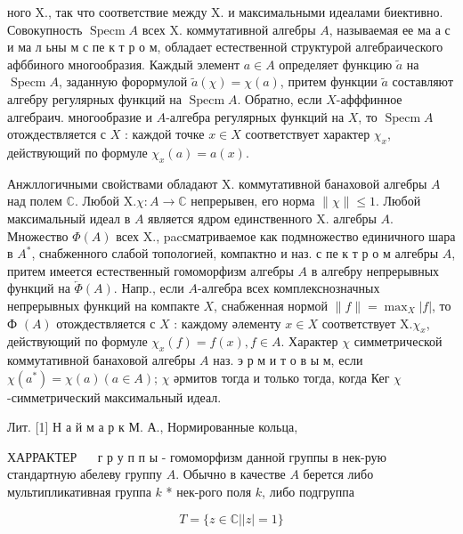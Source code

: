 \documentclass[10pt]{article}
\begin{document}
ного X., так что соответствие между X. и максимальными идеалами биективно. Совокупность $\operatorname{Specm} A$ всех $\mathrm{X}$. коммутативной алгебры $A$, называемая ее ма а с и ма л ьны м с пе к т р о м, обладает естественной структурой алгебраического афббиного многообразия. Каждый элемент $a \in A$ определяет функцию $\tilde{a}$ на $\operatorname{Specm} A$, заданную форормулой $\tilde{a}(\chi)=\chi(a)$, притем функции $\tilde{a}$ составляют алгебру регулярных функций на $\operatorname{Specm} A$. Обратно, если $X$-афффинное алгебраич. многообразие и $A$-алгебра регулярных функций на $X$, то $\operatorname{Specm} A$ отождествляется с $X$ : каждой точке $x \in X$ соответствует характер $\chi_{x}$, действующий по формуле $\chi_{x}(a)=a(x)$.



Анжллогичными свойствами обладают X. коммутативной банаховой алгебры $A$ над полем $\mathbb{C}$. Любой $\mathrm{X} . \chi: A \longrightarrow \mathbb{C}$ непрерывен, его норма $\|\chi\| \leqslant 1$. Любой максимальный идеал в $A$ является ядром единственного $\mathrm{X}$. алгебры $A$. Множество $\Phi(A)$ всех X., pacсматриваемое как подмножество единичного шара в $A^{*}$, снабженного слабой топологией, компактно и наз. с пе к т р о м алгебры $A$, притем имеется естественный гомоморфизм алгебры $A$ в алгебру непрерывных функций на $\overleftarrow{\Phi}(A)$. Напр., если $A$-алгебра всех комплекснозначных непрерывных функций на компакте $X$, снабженная нормой $\|f\|=\max _{X}|f|$, то Ф $(A)$ отождествляется с $X$ : каждому әлементу $x \in X$ соответствует $\mathrm{X} . \chi_{x}$, действующий по формуле $\chi_{x}(f)=f(x), f \in A$. Характер $\chi$ симметрической коммутативной банаховой алгебры $A$ наз. э р м и т о в ы м, если $\chi\left(a^{*}\right)=\chi(a)(a \in A)$; $\chi$ әрмитов тогда и только тогда, когда Кег $\chi$-симметрический максимальный идеал.



Лит. [1] Н а й м а р к М. А., Нормированные кольца,



ХАРРАКТЕР $\quad$ г р у п п ы - гомоморфизм данной группы в нек-рую стандартную абелеву группу $A$. Обычно в качестве $A$ берется либо мультипликативная группа $k$ * нек-рого поля $k$, либо подгруппа



\[

T=\{z \in \mathbb{C}|| z \mid=1\}

\]
\end{document}
